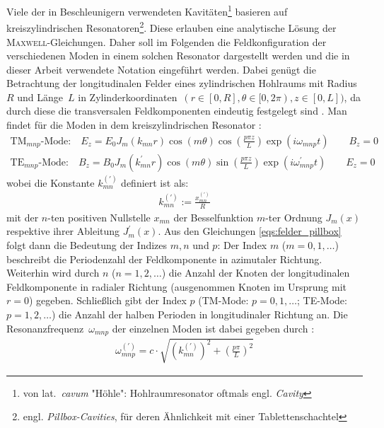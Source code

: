 Viele der in Beschleunigern verwendeten Kavitäten\footnote{von lat.\ \emph{cavum} "Höhle": Hohlraumresonator oftmals engl. \emph{Cavity}} basieren auf kreiszylindrischen Resonatoren\footnote{engl. \emph{Pillbox-Cavities}, für deren Ähnlichkeit mit einer Tablettenschachtel}.
Diese erlauben eine analytische Lösung der \textsc{Maxwell}-Gleichungen.
Daher soll im Folgenden die Feldkonfiguration der verschiedenen Moden in einem solchen Resonator dargestellt werden und die in dieser Arbeit verwendete Notation eingeführt werden.
Dabei genügt die Betrachtung der longitudinalen Felder eines zylindrischen Hohlraums mit Radius~$R$ und Länge~$L$ in Zylinderkoordinaten~$(r \in [0, R], \theta \in [0,2\pi), z \in [0, L])$, da durch diese die transversalen Feldkomponenten eindeutig festgelegt sind \cite[S.\ 4]{hillert}.
Man findet für die Moden in dem kreiszylindrischen Resonator \cite[S. 28 ff.]{wangler}:
\begin{subequations}
  \begin{align}
  \mathrm{TM}_{mnp}\text{-Mode:} \quad E_z = E_0 J_m(k_{mn} r) \cos(m \theta) \cos\left(\frac{p \pi z}{L}\right) \exp(i \omega_{mnp} t) \qquad B_z = 0\\
  \mathrm{TE}_{mnp}\text{-Mode:} \quad B_z = B_0 J_m(k_{mn}^\prime r) \cos(m \theta) \sin\left(\frac{p \pi z}{L}\right) \exp(i \omega_{mnp}^\prime t) \qquad  E_z = 0
  \end{align}
  \label{eqs:felder_pillbox}
\end{subequations}
wobei die Konstante $k_{mn}^{(\prime)}$ definiert ist als:
\begin{align}
k_{mn}^{(\prime)} := \frac{x_{mn}^{(\prime)}}{R}
\end{align}
mit der $n$-ten positiven Nullstelle $x_{mn}$ der Besselfunktion $m$-ter Ordnung $J_m(x)$ respektive ihrer Ableitung $J_m^\prime(x)$.
Aus den Gleichungen \eqref{eqs:felder_pillbox} folgt dann die Bedeutung der Indizes $m, n$ und $p$:
Der Index $m$ ($m=0, 1, \dots$) beschreibt die Periodenzahl der Feldkomponente in azimutaler Richtung.
Weiterhin wird durch $n$ ($n=1, 2, \dots$) die Anzahl der Knoten der longitudinalen Feldkomponente in radialer Richtung (ausgenommen Knoten im Ursprung mit $r=0$) gegeben.
Schließlich gibt der Index $p$ (TM-Mode: $p= 0, 1, \dots$; TE-Mode: $p = 1, 2, \dots$) die Anzahl der halben Perioden in longitudinaler Richtung an.
Die Resonanzfrequenz~$\omega_{mnp}$ der einzelnen Moden ist dabei gegeben durch \cite[S.\ 28 ff.]{wangler}:
\begin{align}
\omega_{mnp}^{(\prime)} = c \cdot \sqrt{\left( k_{mn}^{(\prime)}\right)^2 + \left( \frac{p \pi}{L} \right)^2}
\label{eq:frequenz_pillbox}
\end{align}
